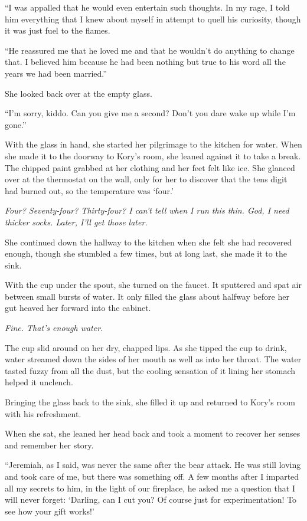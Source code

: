``I was appalled that he would even entertain such thoughts. In my rage, I told him everything that I knew about myself in attempt to quell his curiosity, though it was just fuel to the flames.

``He reassured me that he loved me and that he wouldn't do anything to change that. I believed him because he had been nothing but true to his word all the years we had been married.''

She looked back over at the empty glass.

``I'm sorry, kiddo. Can you give me a second? Don't you dare wake up while I'm gone.''

With the glass in hand, she started her pilgrimage to the kitchen for water. When she made it to the doorway to Kory's room, she leaned against it to take a break. The chipped paint grabbed at her clothing and her feet felt like ice. She glanced over at the thermostat on the wall, only for her to discover that the tens digit had burned out, so the temperature was `four.'

\textit{Four? Seventy-four? Thirty-four? I can't tell when I run this thin. God, I need thicker socks. Later, I'll get those later.}

She continued down the hallway to the kitchen when she felt she had recovered enough, though she stumbled a few times, but at long last, she made it to the sink.

With the cup under the spout, she turned on the faucet. It sputtered and spat air between small bursts of water. It only filled the glass about halfway before her gut heaved her forward into the cabinet.

\textit{Fine. That's enough water.}

The cup slid around on her dry, chapped lips. As she tipped the cup to drink, water streamed down the sides of her mouth as well as into her throat. The water tasted fuzzy from all the dust, but the cooling sensation of it lining her stomach helped it unclench.

Bringing the glass back to the sink, she filled it up and returned to Kory's room with his refreshment.

When she sat, she leaned her head back and took a moment to recover her senses and remember her story.

``Jeremiah, as I said, was never the same after the bear attack. He was still loving and took care of me, but there was something off. A few months after I imparted all my secrets to him, in the light of our fireplace, he asked me a question that I will never forget: `Darling, can I cut you? Of course just for experimentation! To see how your gift works!'


